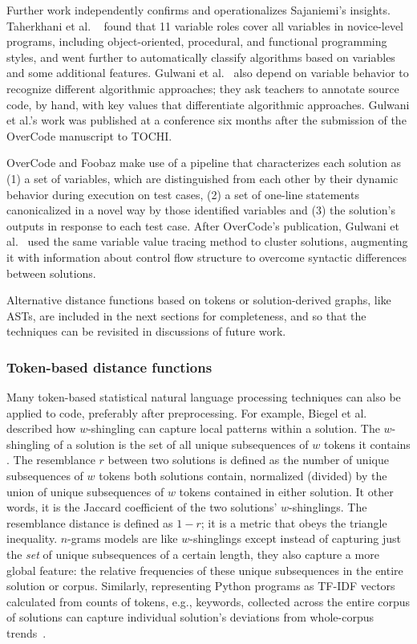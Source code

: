 Further work independently confirms and operationalizes Sajaniemi's insights. Taherkhani et al. ~\cite{taherkhani2010recognizing} found that 11 variable roles cover all variables in novice-level programs, including object-oriented, procedural, and functional programming styles, and went further to automatically classify algorithms based on variables and some additional features. Gulwani et al.~\cite{gulwani_fse14} also depend on variable behavior to recognize different algorithmic approaches; they ask teachers to annotate source code, by hand, with key values that differentiate algorithmic approaches. Gulwani et al.'s work was published at a conference six months after the submission of the OverCode manuscript to TOCHI.

OverCode and Foobaz make use of a pipeline that characterizes each solution as (1) a set of variables, which are distinguished from each other by their dynamic behavior during execution on test cases, (2) a set of one-line statements canonicalized in a novel way by those identified variables and (3) the solution's outputs in response to each test case. After OverCode's publication, Gulwani et al.~\cite{gulwani2016automated} used the same variable value tracing method to cluster solutions, augmenting it with information about control flow structure to overcome syntactic differences between solutions.

Alternative distance functions based on tokens or solution-derived graphs, like ASTs, are included in the next sections for completeness, and so that the techniques can be revisited in discussions of future work.

\subsubsection{Token-based distance functions}
Many token-based statistical natural language processing techniques can also be applied to code, preferably after preprocessing. For example, Biegel et al.~\cite{Biegel} described how $w$-shingling can capture local patterns within a solution. The $w$-shingling of a solution is the set of all unique subsequences of $w$ tokens it contains \cite{BRODER19971157}. The resemblance $r$ between two solutions is defined as the number of unique subsequences of $w$ tokens both solutions contain, normalized (divided) by the union of unique subsequences of $w$ tokens contained in either solution. It other words, it is the Jaccard coefficient of the two solutions' $w$-shinglings. The resemblance distance is defined as $1-r$; it is a metric that obeys the triangle inequality. $n$-grams models are like $w$-shinglings except instead of capturing just the {\it set} of unique subsequences of a certain length, they also capture a more global feature: the relative frequencies of these unique subsequences in the entire solution or corpus. Similarly, representing Python programs as TF-IDF vectors calculated from counts of tokens, e.g., keywords, collected across the entire corpus of solutions can capture individual solution's deviations from whole-corpus trends~\cite{Gaudencio}.


